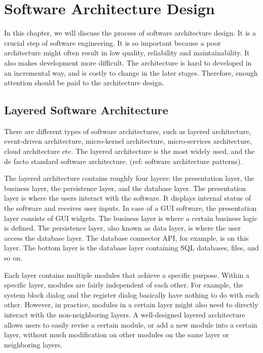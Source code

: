 \chapter{Software Architecture Design}
In this chapter, we will discuss the process of software architecture design. It is a crucial step of software engineering. It is so important because a poor architecture might often result in low quality, reliability and maintainability. It also makes development more difficult. The architecture is hard to developed in an incremental way, and is costly to change in the later stages. Therefore, enough attention should be paid to the architecture design.

\section{Layered Software Architecture}
There are different types of software architectures, such as layered architecture, event-driven architecture, micro-kernel architecture, micro-services architecture, cloud architecture etc. The layered architecture is the most widely used, and the de facto standard software architecture. (ref: software architecture patterns).

The layered architecture contains roughly four layers: the presentation layer, the business layer, the persistence layer, and the database layer. The presentation layer is where the users interact with the software. It displays internal status of the software and receives user inputs. In case of a GUI software, the presentation layer consists of GUI widgets. The business layer is where a certain business logic is defined. The persistence layer, also known as data layer, is where the user access the database layer. The database connector API, for example, is on this layer. The bottom layer is the database layer containing SQL databases, files, and so on.

Each layer contains multiple modules that achieve a specific purpose. Within a specific layer, modules are fairly independent of each other. For example, the system block dialog and the register dialog basically have nothing to do with each other. However, in practice, modules in a certain layer might also need to directly interact with the non-neighboring layers. A well-designed layered architecture allows users to easily revise a certain module, or add a new module into a certain layer, without much modification on other modules on the same layer or neighboring layers.

